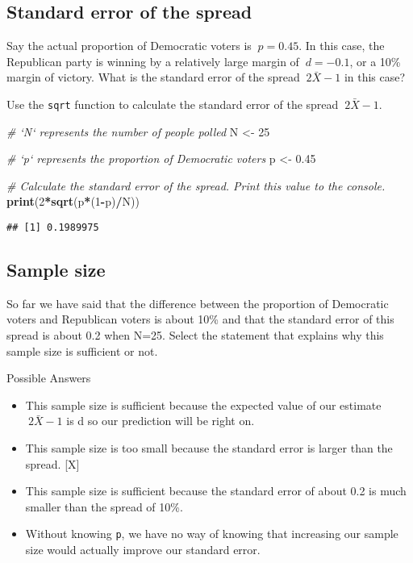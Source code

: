 \documentclass[]{article}
\newenvironment{Shaded}{\begin{snugshade}}{\end{snugshade}}
\newcommand{\KeywordTok}[1]{\textcolor[rgb]{0.13,0.29,0.53}{\textbf{#1}}}
\newcommand{\DecValTok}[1]{\textcolor[rgb]{0.00,0.00,0.81}{#1}}
\newcommand{\FloatTok}[1]{\textcolor[rgb]{0.00,0.00,0.81}{#1}}
\newcommand{\StringTok}[1]{\textcolor[rgb]{0.31,0.60,0.02}{#1}}
\newcommand{\CommentTok}[1]{\textcolor[rgb]{0.56,0.35,0.01}{\textit{#1}}}
\newcommand{\OperatorTok}[1]{\textcolor[rgb]{0.81,0.36,0.00}{\textbf{#1}}}
\newcommand{\NormalTok}[1]{#1}
\providecommand{\tightlist}{%
  \setlength{\itemsep}{0pt}\setlength{\parskip}{0pt}}
\begin{document}
\subsection{\texorpdfstring{\textbf{Standard error of the
spread}}{Standard error of the spread}}\label{standard-error-of-the-spread}

Say the actual proportion of Democratic voters is \(\ p=0.45\). In this
case, the Republican party is winning by a relatively large margin of
\(\ d=−0.1\), or a 10\% margin of victory. What is the standard error of
the spread \(\ 2\bar{X}−1\) in this case?

Use the \texttt{sqrt} function to calculate the standard error of the
spread \(\ 2\bar{X}−1\).

\begin{Shaded}
\begin{Highlighting}[]
\CommentTok{# `N` represents the number of people polled}
\NormalTok{N <-}\StringTok{ }\DecValTok{25}

\CommentTok{# `p` represents the proportion of Democratic voters}
\NormalTok{p <-}\StringTok{ }\FloatTok{0.45}

\CommentTok{# Calculate the standard error of the spread. Print this value to the console.}
\KeywordTok{print}\NormalTok{(}\DecValTok{2}\OperatorTok{*}\KeywordTok{sqrt}\NormalTok{(p}\OperatorTok{*}\NormalTok{(}\DecValTok{1}\OperatorTok{-}\NormalTok{p)}\OperatorTok{/}\NormalTok{N))}
\end{Highlighting}
\end{Shaded}

\begin{verbatim}
## [1] 0.1989975
\end{verbatim}

\subsection{\texorpdfstring{\textbf{Sample
size}}{Sample size}}\label{sample-size}

So far we have said that the difference between the proportion of
Democratic voters and Republican voters is about 10\% and that the
standard error of this spread is about 0.2 when N=25. Select the
statement that explains why this sample size is sufficient or not.

Possible Answers

\begin{itemize}
\tightlist
\item
  This sample size is sufficient because the expected value of our
  estimate \(\ 2\bar{X}−1\) is d so our prediction will be right on.
\item
  This sample size is too small because the standard error is larger
  than the spread. {[}X{]}
\item
  This sample size is sufficient because the standard error of about 0.2
  is much smaller than the spread of 10\%.
\item
  Without knowing \texttt{p}, we have no way of knowing that increasing
  our sample size would actually improve our standard error.
\end{itemize}
\end{document}
